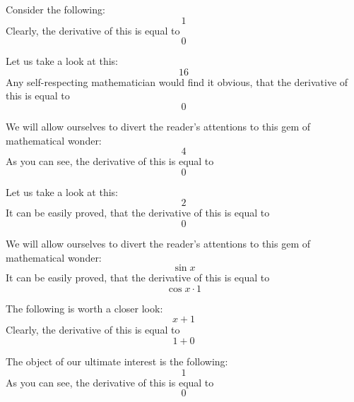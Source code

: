\documentclass{article}
\begin{document}
Consider the following:
\begin{equation}
1 
\end{equation}
Clearly, the derivative of this is equal to
\begin{equation}
0 
\end{equation}

Let us take a look at this:
\begin{equation}
16 
\end{equation}
Any self-respecting mathematician would find it obvious, that the derivative of this is equal to
\begin{equation}
0 
\end{equation}

We will allow ourselves to divert the reader's attentions to this gem of mathematical wonder:
\begin{equation}
4 
\end{equation}
As you can see, the derivative of this is equal to
\begin{equation}
0 
\end{equation}

Let us take a look at this:
\begin{equation}
2 
\end{equation}
It can be easily proved, that the derivative of this is equal to
\begin{equation}
0 
\end{equation}

We will allow ourselves to divert the reader's attentions to this gem of mathematical wonder:
\begin{equation}
\sin x 
\end{equation}
It can be easily proved, that the derivative of this is equal to
\begin{equation}
\cos x \cdot 1 
\end{equation}

The following is worth a closer look:
\begin{equation}
x + 1 
\end{equation}
Clearly, the derivative of this is equal to
\begin{equation}
1 + 0 
\end{equation}

The object of our ultimate interest is the following:
\begin{equation}
1 
\end{equation}
As you can see, the derivative of this is equal to
\begin{equation}
0 
\end{equation}
\end{document}
